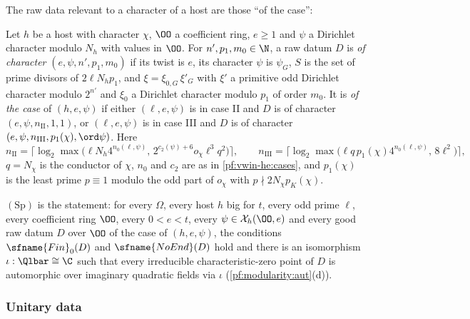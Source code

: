 The raw data relevant to a character of a host are those ``of the case'':

\begin{definition}\label{pf:modularity:ofcase}
Let $h$ be a host with character $\chi$, $\OO$ a coefficient ring, $e\ge1$ and $\psi$ a Dirichlet character modulo
$N_h$ with values in $\OO$. For $n',p_1,m_0\in\N$, a raw datum $D$ is \emph{of character} $(e,\psi,n',p_1,m_0)$ if its
twist is $e$, its character $\psi$ is $\psi_G$, $S$ is the set of prime divisors of $2\ell N_hp_1$, and
$\xi=\xi_{0,G}\,\xi'_G$ with $\xi'$ a primitive odd Dirichlet character modulo $2^{n'}$ and $\xi_0$ a Dirichlet
character modulo $p_1$ of order $m_0$. It is \emph{of the case} of $(h,e,\psi)$ if either $(\ell,e,\psi)$ is in case
II and $D$ is of character $(e,\psi,n_{\mathrm{II}},1,1)$, or $(\ell,e,\psi)$ is in case III and $D$ is of character
$(e,\psi,n_{\mathrm{III}},p_1(\chi),\ord\psi)$. Here
\[
 n_{\mathrm{II}}=\bigl\lceil\log_2\max\bigl(\ell N_h4^{n_0(\ell,\psi)},\,2^{c_2(\psi)+6}o_\chi\ell^3q^2\bigr)\bigr\rceil,\qquad
 n_{\mathrm{III}}=\bigl\lceil\log_2\max\bigl(\ell q\,p_1(\chi)4^{n_0(\ell,\psi)},\,8\ell^2\bigr)\bigr\rceil,
\]
$q=N_\chi$ is the conductor of $\chi$, $n_0$ and $c_2$ are as in \cref{pf:vwin-he:cases}, and $p_1(\chi)$ is the least
prime $p\equiv1$ modulo the odd part of $o_\chi$ with $p\nmid2N_\chi p_K(\chi)$.
\end{definition}

\begin{definition}\label{pf:modularity:Sp}
$(\mathrm{Sp})$ is the statement: for every $\Omega$, every host $h$ big for $t$, every odd prime $\ell$, every
coefficient ring $\OO$, every $0<e<t$, every $\psi\in\mathcal X_h(\OO,e)$ and every good raw datum $D$ over $\OO$ of the
case of $(h,e,\psi)$, the conditions $\sfname{Fin}_0(D)$ and $\sfname{NoEnd}(D)$ hold and there is an isomorphism
$\iota:\Qlbar\cong\C$ such that every irreducible characteristic-zero point of $D$ is automorphic over imaginary
quadratic fields via $\iota$ (\cref{pf:modularity:aut}(d)).
\end{definition}

\subsubsection{Unitary data}

